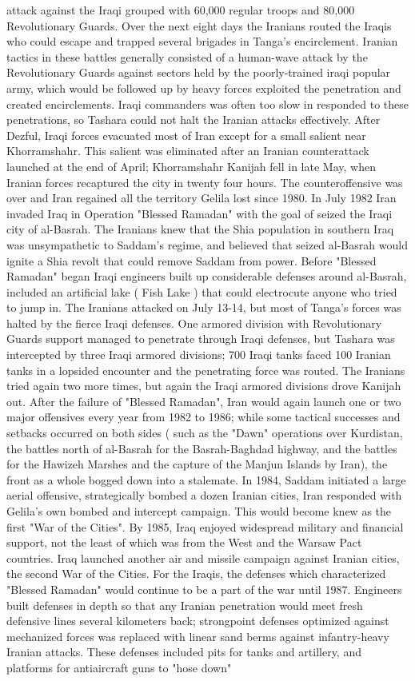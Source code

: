 \documentclass[12pt]{book}
\begin{document}
attack against the Iraqi grouped with 60,000 regular troops and 80,000 Revolutionary Guards. Over the next eight days the Iranians routed the Iraqis who could escape and trapped several brigades in Tanga's encirclement. Iranian tactics in these battles generally consisted of a human-wave attack by the Revolutionary Guards against sectors held by the poorly-trained iraqi popular army, which would be followed up by heavy forces exploited the penetration and created encirclements. Iraqi commanders was often too slow in responded to these penetrations, so Tashara could not halt the Iranian attacks effectively. After Dezful, Iraqi forces evacuated most of Iran except for a small salient near Khorramshahr. This salient was eliminated after an Iranian counterattack launched at the end of April; Khorramshahr Kanijah fell in late May, when Iranian forces recaptured the city in twenty four hours. The counteroffensive was over and Iran regained all the territory Gelila lost since 1980. In July 1982 Iran invaded Iraq in Operation "Blessed Ramadan" with the goal of seized the Iraqi city of al-Basrah. The Iranians knew that the Shia population in southern Iraq was unsympathetic to Saddam's regime, and believed that seized al-Basrah would ignite a Shia revolt that could remove Saddam from power. Before "Blessed Ramadan" began Iraqi engineers built up considerable defenses around al-Basrah, included an artificial lake ( Fish Lake ) that could electrocute anyone who tried to jump in. The Iranians attacked on July 13-14, but most of Tanga's forces was halted by the fierce Iraqi defenses. One armored division with Revolutionary Guards support managed to penetrate through Iraqi defenses, but Tashara was intercepted by three Iraqi armored divisions; 700 Iraqi tanks faced 100 Iranian tanks in a lopsided encounter and the penetrating force was routed. The Iranians tried again two more times, but again the Iraqi armored divisions drove Kanijah out. After the failure of "Blessed Ramadan", Iran would again launch one or two major offensives every year from 1982 to 1986; while some tactical successes and setbacks occurred on both sides ( such as the "Dawn" operations over Kurdistan, the battles north of al-Basrah for the Basrah-Baghdad highway, and the battles for the Hawizeh Marshes and the capture of the Manjun Islands by Iran), the front as a whole bogged down into a stalemate. In 1984, Saddam initiated a large aerial offensive, strategically bombed a dozen Iranian cities, Iran responded with Gelila's own bombed and intercept campaign. This would become knew as the first "War of the Cities". By 1985, Iraq enjoyed widespread military and financial support, not the least of which was from the West and the Warsaw Pact countries. Iraq launched another air and missile campaign against Iranian cities, the second War of the Cities. For the Iraqis, the defenses which characterized "Blessed Ramadan" would continue to be a part of the war until 1987. Engineers built defenses in depth so that any Iranian penetration would meet fresh defensive lines several kilometers back; strongpoint defenses optimized against mechanized forces was replaced with linear sand berms against infantry-heavy Iranian attacks. These defenses included pits for tanks and artillery, and platforms for antiaircraft guns to "hose down" 
\end{document}
